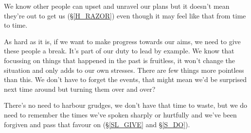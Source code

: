 \cleardoublepage
\begin{multicols}{2}

We know other people can upset and unravel our plans but it doesn't mean they're out to get us (\S \ref{H_RAZOR}) even though it may feel like that from time to time.

As hard as it is, if we want to make progress towards our aims, we need to give these people a break. It's part of our duty to lead by example. We know that focussing on things that happened in the past is fruitless, it won't change the situation and only adds to our own stresses. There are few things more pointless than this. We don't have to forget the events, that might mean we'd be surprised next time around but turning them over and over?

There's no need to harbour grudges, we don't have that time to waste, but we do need to remember the times we've spoken sharply or hurtfully and we've been forgiven and pass that favour on (\S \ref{SL_GIVE} and \S \ref{S_DO}). 

\end{multicols}
\clearpage
